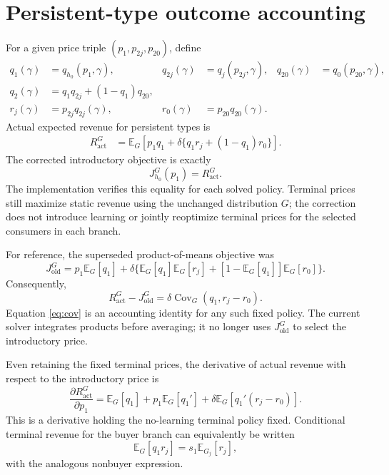 \documentclass[11pt]{article}
\newcommand{\E}{\mathbb{E}}
\newcommand{\Cov}{\operatorname{Cov}}
\begin{document}
\section{Persistent-type outcome accounting}
For a given price triple $(p_1,p_{2j},p_{20})$, define
\begin{align}
 q_1(\gamma)&=q_{h_0}(p_1,\gamma),&
 q_{2j}(\gamma)&=q_j(p_{2j},\gamma),&
 q_{20}(\gamma)&=q_0(p_{20},\gamma),\\
 q_2(\gamma)&=q_1q_{2j}+(1-q_1)q_{20},\\
 r_j(\gamma)&=p_{2j}q_{2j}(\gamma),&
 r_0(\gamma)&=p_{20}q_{20}(\gamma).
\end{align}
Actual expected revenue for persistent types is
\begin{align}
 R_{\mathrm{act}}^G
 &=\E_G\!\left[p_1q_1+\delta\{q_1r_j+(1-q_1)r_0\}\right].\label{eq:actual}
\end{align}
The corrected introductory objective is exactly
\begin{equation}
 J_{h_0}^G(p_1)=R_{\mathrm{act}}^G.
\end{equation}
The implementation verifies this equality for each solved policy. Terminal
prices still maximize static revenue using the unchanged distribution $G$;
the correction does not introduce learning or jointly reoptimize terminal
prices for the selected consumers in each branch.

For reference, the superseded product-of-means objective was
\begin{equation}
 J_{\mathrm{old}}^G=p_1\E_G[q_1]+\delta\{\E_G[q_1]\E_G[r_j]
 +[1-\E_G[q_1]]\E_G[r_0]\}.
\end{equation}
Consequently,
\begin{equation}
 \boxed{R_{\mathrm{act}}^G-J_{\mathrm{old}}^G
 =\delta\Cov_G(q_1,r_j-r_0).}\label{eq:cov}
\end{equation}
Equation \eqref{eq:cov} is an accounting identity for any such fixed policy.
The current solver integrates products before averaging; it no longer uses
$J_{\mathrm{old}}^G$ to select the introductory price.

Even retaining the fixed terminal prices, the derivative of actual revenue
with respect to the introductory price is
\begin{equation}
 \frac{\partial R_{\mathrm{act}}^G}{\partial p_1}
 =\E_G[q_1]+p_1\E_G[q_1']
 +\delta\E_G[q_1'(r_j-r_0)].
\end{equation}
This is a derivative holding the no-learning terminal policy fixed.
Conditional terminal revenue for the buyer
branch can equivalently be written
\begin{equation}
 \E_G[q_1r_j]=s_1\E_{G_j}[r_j],
\end{equation}
with the analogous nonbuyer expression.
\end{document}

